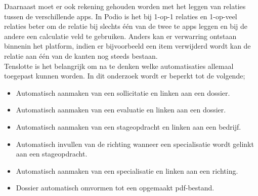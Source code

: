 Daarnaast moet er ook rekening gehouden worden met het leggen van relaties tussen de verschillende apps. In Podio is het bij 1-op-1 relaties en 1-op-veel relaties beter om de relatie bij slechts één van de twee te apps leggen en bij de andere een calculatie veld te gebruiken. Anders kan er verwarring ontstaan binnenin het platform, indien er bijvoorbeeld een item verwijderd wordt kan de relatie aan één van de kanten nog steeds bestaan. \\

Tenslotte is het belangrijk om na te denken welke automatisaties allemaal toegepast kunnen worden. In dit onderzoek wordt er beperkt tot de volgende;

\begin{itemize}
    \item Automatisch aanmaken van een sollicitatie en linken aan een dossier.
    \item Automatisch aanmaken van een evaluatie en linken aan een dossier.
    \item Automatisch aanmaken van een stageopdracht en linken aan een bedrijf.
    \item Automatisch invullen van de richting wanneer een specialisatie wordt gelinkt aan een stageopdracht.
    \item Automatisch aanmaken van een specialisatie en linken aan een richting.
    \item Dossier automatisch omvormen tot een opgemaakt pdf-bestand.
\end{itemize}

